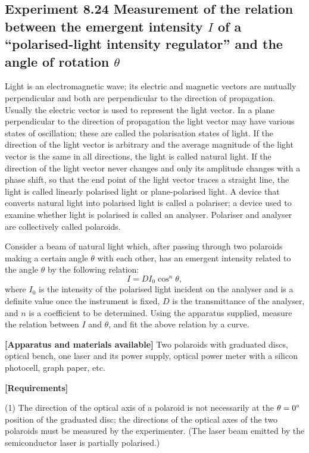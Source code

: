 \subsection*{Experiment 8.24 \quad Measurement of the relation between the emergent intensity $I$ of a ``polarised-light intensity regulator'' and the angle of rotation $\theta$}

Light is an electromagnetic wave; its electric and magnetic vectors are mutually perpendicular and both are perpendicular to the direction of propagation. Usually the electric vector is used to represent the light vector. In a plane perpendicular to the direction of propagation the light vector may have various states of oscillation; these are called the polarisation states of light. If the direction of the light vector is arbitrary and the average magnitude of the light vector is the same in all directions, the light is called natural light. If the direction of the light vector never changes and only its amplitude changes with a phase shift, so that the end point of the light vector traces a straight line, the light is called linearly polarised light or plane-polarised light. A device that converts natural light into polarised light is called a polariser; a device used to examine whether light is polarised is called an analyser. Polariser and analyser are collectively called polaroids.

Consider a beam of natural light which, after passing through two polaroids making a certain angle $\theta$ with each other, has an emergent intensity related to the angle $\theta$ by the following relation:
\[
I=DI_0\cos^n\theta,
\]
where $I_0$ is the intensity of the polarised light incident on the analyser and is a definite value once the instrument is fixed, $D$ is the transmittance of the analyser, and $n$ is a coefficient to be determined. Using the apparatus supplied, measure the relation between $I$ and $\theta$, and fit the above relation by a curve.

\textbf{[Apparatus and materials available]} Two polaroids with graduated discs, optical bench, one laser and its power supply, optical power meter with a silicon photocell, graph paper, etc.

\textbf{[Requirements]}

(1) The direction of the optical axis of a polaroid is not necessarily at the $\theta=0^{\circ}$ position of the graduated disc; the directions of the optical axes of the two polaroids must be measured by the experimenter. (The laser beam emitted by the semiconductor laser is partially polarised.)

